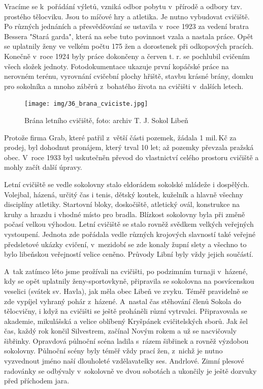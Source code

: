 \documentclass[a5paper, 11pt, twoside]{article}
\begin{document}
Vracíme se k~pořádání výletů, vzniká odbor pobytu v~přírodě a odbory
tzv. prostého tělocviku. Jsou to míčové hry a atletika. Je nutno
vybudovat cvičiště. Po různých jednáních a přesvědčování se ustavila
v~roce 1923 za vedení bratra Bessera "Stará garda", která na sebe tuto
povinnost vzala a nastala práce. Opět se uplatnily ženy ve velkém počtu
175 žen a dorostenek při odkopových pracích. Konečně v~roce 1924 byly
práce dokončeny a červen t. r. se pochlubil cvičením všech složek
jednoty. Fotodokumentace ukazuje první kopáčské práce na nerovném
terénu, vyrovnání cvičební plochy hřiště, stavbu krásné brány, domku pro
sokolníka a mnoho záběrů z~bohatého života na cvičišti v~dalších letech.

\begin{figure}[h!]
  \centering 
  \texttt{[image: img/36\_brana\_cviciste.jpg]}
  \caption*{Brána letního cvičiště, foto: archiv T. J. Sokol Libeň}
\end{figure}

Protože firma Grab, které patřil z~větší části pozemek, žádala 1 mil.\,Kč
za prodej, byl dohodnut pronájem, který trval 10 let; až pozemky
převzala pražská obec. V~roce 1933 byl uskutečněn převod do vlastnictví
celého prostoru cvičiště a mohly začít další úpravy.

Letní cvičiště se vedle sokolovny stalo eldorádem sokolské mládeže i
dospělých. Volejbal, házená, určitý čas i tenis, dětský koutek, kuželník
a hlavně všechny disciplíny atletiky. Startovní bloky, doskočiště,
atletický ovál, konstrukce na kruhy a hrazdu i vhodné místo pro bradla.
Blízkost sokolovny byla při změně počasí velkou výhodou. Letní cvičiště
se stalo rovněž svědkem velkých veřejných vystoupení. Jednota zde
pořádala vedle různých krojových slavností také veřejné předsletové
ukázky cvičení, v~mezidobí se zde konaly župní slety a všechno to bylo
libeňskou veřejností velice ceněno. Průvody Libní byly vždy jejich
součástí.

A~tak zatímco léto jsme prožívali na cvičišti, po podzimním turnaji
v~házené, kdy se opět uplatnily ženy-sportovkyně, připravila se sokolovna
na posvícenskou veselici (svátek sv. Havla), jak měla obec Libeň ve
zvyku. Téměř pravidelně se zde vypíjel vyhraný pohár z~házené. A~nastal
čas stěhování členů Sokola do tělocvičny, i když na cvičišti se ještě
proháněli různí vytrvalci. Připravovala se akademie, mikulášská a velice
oblíbený Kryšpánek cvičitelských sborů. Jak šel čas, každý rok končil
Silvestrem, začínal Novým rokem a už se nacvičovaly šibřinky. Opravdová
půlnoční scéna ladila s~rázem šibřinek a rovněž výzdobou sokolovny.
Půlnoční scény byly téměř vždy prací žen, z~nichž je nutno vyzvednout
jméno naší dlouholeté vzdělavatelky ses. Andrlové. Zimní plesové
radovánky se odbývaly v~sokolovně ve dvou sobotách a ukončily je ještě
dozvuky před příchodem jara.
\end{document}
